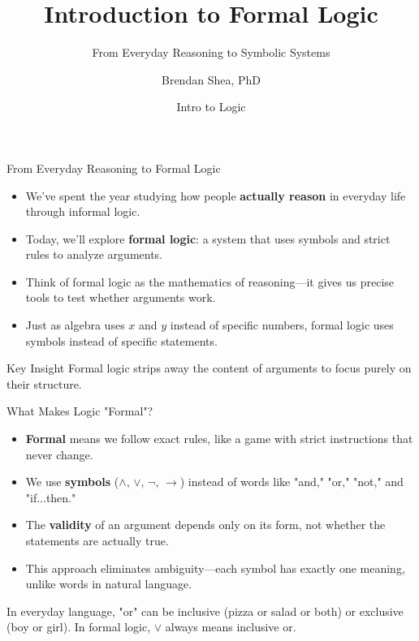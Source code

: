 \documentclass{beamer}
\title{Introduction to Formal Logic}
\subtitle{From Everyday Reasoning to Symbolic Systems}
\author{Brendan Shea, PhD}
\date{Intro to Logic}
\begin{document}
	
	\frame{\titlepage}
	
	\begin{frame}{From Everyday Reasoning to Formal Logic}
		\begin{itemize}
			\item We've spent the year studying how people \textbf{actually reason} in everyday life through informal logic.
			\item Today, we'll explore \textbf{formal logic}: a system that uses symbols and strict rules to analyze arguments.
			\item Think of formal logic as the mathematics of reasoning—it gives us precise tools to test whether arguments work.
			\item Just as algebra uses $x$ and $y$ instead of specific numbers, formal logic uses symbols instead of specific statements.
		\end{itemize}
		
		\begin{alertblock}{Key Insight}
			Formal logic strips away the content of arguments to focus purely on their structure.
		\end{alertblock}
	\end{frame}
	
	\begin{frame}{What Makes Logic "Formal"?}
		\begin{itemize}
			\item \textbf{Formal} means we follow exact rules, like a game with strict instructions that never change.
			\item We use \textbf{symbols} ($\wedge$, $\vee$, $\neg$, $\rightarrow$) instead of words like "and," "or," "not," and "if...then."
			\item The \textbf{validity} of an argument depends only on its form, not whether the statements are actually true.
			\item This approach eliminates ambiguity—each symbol has exactly one meaning, unlike words in natural language.
		\end{itemize}
		
		\begin{example}
			In everyday language, "or" can be inclusive (pizza or salad or both) or exclusive (boy or girl). In formal logic, $\vee$ always means inclusive or.
		\end{example}
	\end{frame}
	
\end{document}
